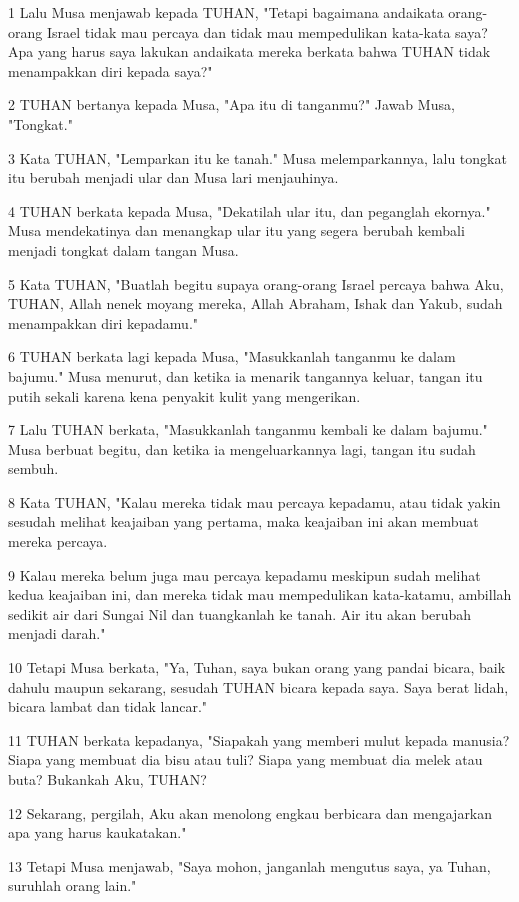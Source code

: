 \par 1 Lalu Musa menjawab kepada TUHAN, "Tetapi bagaimana andaikata orang-orang Israel tidak mau percaya dan tidak mau mempedulikan kata-kata saya? Apa yang harus saya lakukan andaikata mereka berkata bahwa TUHAN tidak menampakkan diri kepada saya?"
\par 2 TUHAN bertanya kepada Musa, "Apa itu di tanganmu?" Jawab Musa, "Tongkat."
\par 3 Kata TUHAN, "Lemparkan itu ke tanah." Musa melemparkannya, lalu tongkat itu berubah menjadi ular dan Musa lari menjauhinya.
\par 4 TUHAN berkata kepada Musa, "Dekatilah ular itu, dan peganglah ekornya." Musa mendekatinya dan menangkap ular itu yang segera berubah kembali menjadi tongkat dalam tangan Musa.
\par 5 Kata TUHAN, "Buatlah begitu supaya orang-orang Israel percaya bahwa Aku, TUHAN, Allah nenek moyang mereka, Allah Abraham, Ishak dan Yakub, sudah menampakkan diri kepadamu."
\par 6 TUHAN berkata lagi kepada Musa, "Masukkanlah tanganmu ke dalam bajumu." Musa menurut, dan ketika ia menarik tangannya keluar, tangan itu putih sekali karena kena penyakit kulit yang mengerikan.
\par 7 Lalu TUHAN berkata, "Masukkanlah tanganmu kembali ke dalam bajumu." Musa berbuat begitu, dan ketika ia mengeluarkannya lagi, tangan itu sudah sembuh.
\par 8 Kata TUHAN, "Kalau mereka tidak mau percaya kepadamu, atau tidak yakin sesudah melihat keajaiban yang pertama, maka keajaiban ini akan membuat mereka percaya.
\par 9 Kalau mereka belum juga mau percaya kepadamu meskipun sudah melihat kedua keajaiban ini, dan mereka tidak mau mempedulikan kata-katamu, ambillah sedikit air dari Sungai Nil dan tuangkanlah ke tanah. Air itu akan berubah menjadi darah."
\par 10 Tetapi Musa berkata, "Ya, Tuhan, saya bukan orang yang pandai bicara, baik dahulu maupun sekarang, sesudah TUHAN bicara kepada saya. Saya berat lidah, bicara lambat dan tidak lancar."
\par 11 TUHAN berkata kepadanya, "Siapakah yang memberi mulut kepada manusia? Siapa yang membuat dia bisu atau tuli? Siapa yang membuat dia melek atau buta? Bukankah Aku, TUHAN?
\par 12 Sekarang, pergilah, Aku akan menolong engkau berbicara dan mengajarkan apa yang harus kaukatakan."
\par 13 Tetapi Musa menjawab, "Saya mohon, janganlah mengutus saya, ya Tuhan, suruhlah orang lain."
